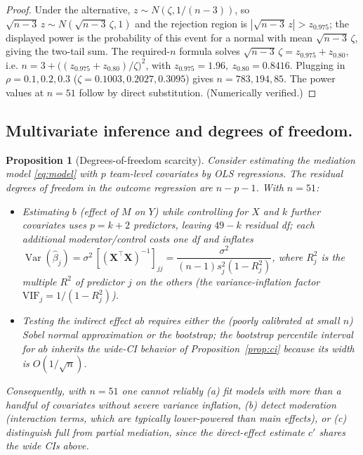 \documentclass{amsart}
\newtheorem{proposition}{Proposition}
\theoremstyle{definition}
\begin{document}
\begin{proof}
Under the alternative, $z\sim N(\zeta,1/(n-3))$, so $\sqrt{n-3}\,z\sim
N(\sqrt{n-3}\,\zeta,1)$ and the rejection region is
$|\sqrt{n-3}\,z|>z_{0.975}$; the displayed power is the probability of this
event for a normal with mean $\sqrt{n-3}\,\zeta$, giving the two-tail sum.
The required-$n$ formula solves
$\sqrt{n-3}\,\zeta=z_{0.975}+z_{0.80}$, i.e.
$n=3+\big((z_{0.975}+z_{0.80})/\zeta\big)^2$, with
$z_{0.975}=1.96,\ z_{0.80}=0.8416$. Plugging in $\rho=0.1,0.2,0.3$
($\zeta=0.1003,0.2027,0.3095$) gives $n=783,194,85$. The power values at
$n=51$ follow by direct substitution. (Numerically verified.)
\end{proof}

\subsection*{Multivariate inference and degrees of freedom.}
\begin{proposition}[Degrees-of-freedom scarcity]\label{prop:df}
Consider estimating the mediation model \eqref{eq:model} with $p$
team-level covariates by OLS regressions. The residual degrees of freedom in
the outcome regression are $n-p-1$. With $n=51$:
\begin{itemize}
\item Estimating $b$ (effect of $M$ on $Y$) while controlling for $X$ and
$k$ further covariates uses $p=k+2$ predictors, leaving $49-k$ residual df;
each additional moderator/control costs one df and inflates
$\operatorname{Var}(\hat\beta_j)=\sigma^2\,[(\mathbf X^\top\mathbf X)^{-1}]_{jj}
=\dfrac{\sigma^2}{(n-1)s_j^2(1-R_j^2)}$, where $R_j^2$ is the multiple
$R^2$ of predictor $j$ on the others (the variance-inflation factor
$\mathrm{VIF}_j=1/(1-R_j^2)$).
\item Testing the indirect effect $ab$ requires either the (poorly
calibrated at small $n$) Sobel normal approximation or the bootstrap; the
bootstrap percentile interval for $ab$ inherits the wide-CI behavior of
Proposition~\ref{prop:ci} because its width is $O(1/\sqrt{n})$.
\end{itemize}
Consequently, with $n=51$ one cannot reliably (a) fit models with more than a
handful of covariates without severe variance inflation, (b) detect
moderation (interaction terms, which are typically lower-powered than main
effects), or (c) distinguish full from partial mediation, since the
direct-effect estimate $c'$ shares the wide CIs above.
\end{proposition}
\end{document}
